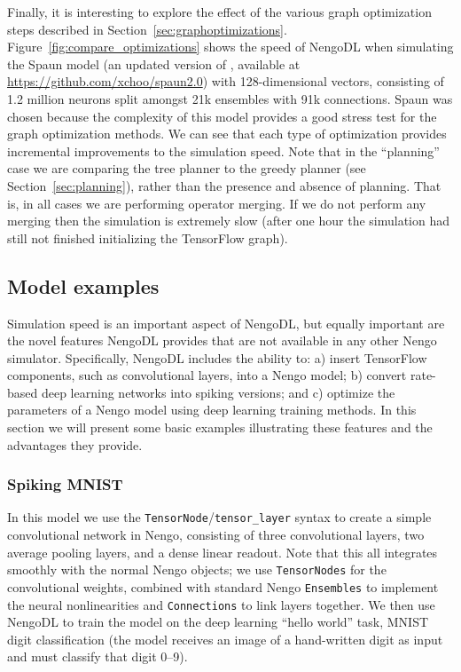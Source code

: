 \documentclass{article}
\begin{document}
Finally, it is interesting to explore the effect of the various graph optimization steps described in Section~\ref{sec:graphoptimizations}.  Figure~\ref{fig:compare_optimizations} shows the speed of NengoDL when simulating the Spaun model (an updated version of \citealt{Eliasmith2012a}, available at \url{https://github.com/xchoo/spaun2.0}) with 128-dimensional vectors, consisting of 1.2 million neurons split amongst 21k ensembles with 91k connections.  Spaun was chosen because the complexity of this model provides a good stress test for the graph optimization methods.  We can see that each type of optimization provides incremental improvements to the simulation speed.  Note that in the ``planning'' case we are comparing the tree planner to the greedy planner (see Section~\ref{sec:planning}), rather than the presence and absence of planning.  That is, in all cases we are performing operator merging.  If we do not perform any merging then the simulation is extremely slow (after one hour the simulation had still not finished initializing the TensorFlow graph).

\subsection{Model examples}

Simulation speed is an important aspect of NengoDL, but equally important are the novel features NengoDL provides that are not available in any other Nengo simulator.  Specifically, NengoDL includes the ability to: a) insert TensorFlow components, such as convolutional layers, into a Nengo model; b) convert rate-based deep learning networks into spiking versions; and c) optimize the parameters of a Nengo model using deep learning training methods.  In this section we will present some basic examples illustrating these features and the advantages they provide.

\subsubsection{Spiking MNIST}
\label{sec:spiking_mnist}

In this model we use the \texttt{TensorNode}/\texttt{tensor\_layer} syntax to create a simple convolutional network in Nengo, consisting of three convolutional layers, two average pooling layers, and a dense linear readout.  Note that this all integrates smoothly with the normal Nengo objects; we use \texttt{TensorNodes} for the convolutional weights, combined with standard Nengo \texttt{Ensembles} to implement the neural nonlinearities and \texttt{Connections} to link layers together.  We then use NengoDL to train the model on the deep learning ``hello world'' task, MNIST digit classification (the model receives an image of a hand-written digit as input and must classify that digit 0--9).
\end{document}
